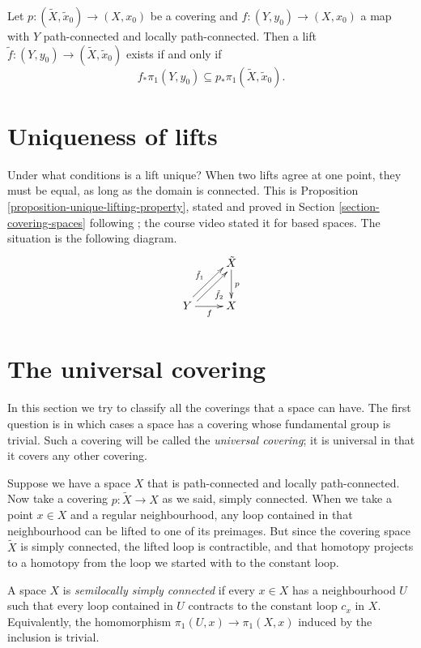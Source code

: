 \begin{proposition}
\label{proposition-lifting-criterion}
Let $p:(\tilde{X},\tilde{x}_0)\to(X,x_0)$ be
a covering and $f:(Y,y_0)\to(X,x_0)$ a map
with $Y$ path-connected and locally
path-connected. Then a lift
$\tilde{f}:(Y,y_0)\to
(\tilde{X},\tilde{x}_0)$
exists if and only if
$$
f_*\pi_1(Y,y_0)\subseteq
p_*\pi_1(\tilde{X},\tilde{x}_0).
$$
\end{proposition}

\section{Uniqueness of lifts}
\label{section-covering-uniqueness-lifts}

Under what conditions is a lift unique? When
two lifts agree at one point, they must be
equal, as long as the domain is connected.
This is Proposition
\ref{proposition-unique-lifting-property},
stated and proved in
Section \ref{section-covering-spaces}
following \cite{hat}; the course video
stated it for based spaces. The situation is
the following diagram.
$$
\xymatrix{
  & \tilde{X} \ar[d]^{p} \\
Y \ar@<0.6ex>[ur]^{\tilde{f}_1}
  \ar@<-0.6ex>[ur]_{\tilde{f}_2}
  \ar[r]_{f}
  & X
}
$$

\section{The universal covering}
\label{section-universal-covering}

In this section we try to classify all the
coverings that a space can have. The first
question is in which cases a space has a
covering whose fundamental group is trivial.
Such a covering will be called the
{\it universal covering}; it is universal in
that it covers any other covering.

Suppose we have a space $X$ that is
path-connected and locally path-connected.
Now take a covering $p:\tilde{X}\to X$ as we
said, simply connected. When we take a point
$x\in X$ and a regular neighbourhood, any
loop contained in that neighbourhood can be
lifted to one of its preimages. But since
the covering space $\tilde{X}$ is simply
connected, the lifted loop is contractible,
and that homotopy projects to a homotopy
from the loop we started with to the
constant loop.

\begin{definition}
\label{definition-semilocally-simply-conn}
A space $X$ is
{\it semilocally simply connected} if every
$x\in X$ has a neighbourhood $U$ such that
every loop contained in $U$ contracts to the
constant loop $c_x$ in $X$. Equivalently,
the homomorphism
$\pi_1(U,x)\to\pi_1(X,x)$ induced by the
inclusion is trivial.
\end{definition}

